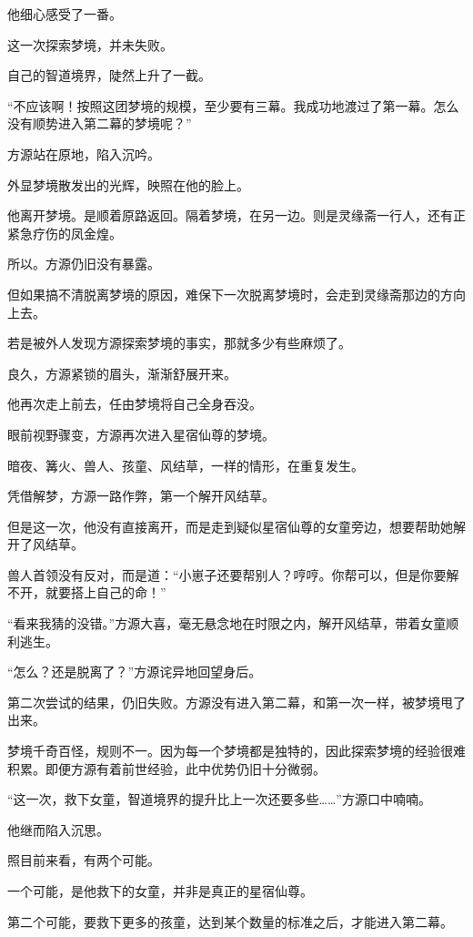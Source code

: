 \begin{this_body}
他细心感受了一番。

这一次探索梦境，并未失败。

自己的智道境界，陡然上升了一截。

“不应该啊！按照这团梦境的规模，至少要有三幕。我成功地渡过了第一幕。怎么没有顺势进入第二幕的梦境呢？”

方源站在原地，陷入沉吟。

外显梦境散发出的光辉，映照在他的脸上。

他离开梦境。是顺着原路返回。隔着梦境，在另一边。则是灵缘斋一行人，还有正紧急疗伤的凤金煌。

所以。方源仍旧没有暴露。

但如果搞不清脱离梦境的原因，难保下一次脱离梦境时，会走到灵缘斋那边的方向上去。

若是被外人发现方源探索梦境的事实，那就多少有些麻烦了。

良久，方源紧锁的眉头，渐渐舒展开来。

他再次走上前去，任由梦境将自己全身吞没。

眼前视野骤变，方源再次进入星宿仙尊的梦境。

暗夜、篝火、兽人、孩童、风结草，一样的情形，在重复发生。

凭借解梦，方源一路作弊，第一个解开风结草。

但是这一次，他没有直接离开，而是走到疑似星宿仙尊的女童旁边，想要帮助她解开了风结草。

兽人首领没有反对，而是道：“小崽子还要帮别人？哼哼。你帮可以，但是你要解不开，就要搭上自己的命！”

“看来我猜的没错。”方源大喜，毫无悬念地在时限之内，解开风结草，带着女童顺利逃生。

“怎么？还是脱离了？”方源诧异地回望身后。

第二次尝试的结果，仍旧失败。方源没有进入第二幕，和第一次一样，被梦境甩了出来。

梦境千奇百怪，规则不一。因为每一个梦境都是独特的，因此探索梦境的经验很难积累。即便方源有着前世经验，此中优势仍旧十分微弱。

“这一次，救下女童，智道境界的提升比上一次还要多些……”方源口中喃喃。

他继而陷入沉思。

照目前来看，有两个可能。

一个可能，是他救下的女童，并非是真正的星宿仙尊。

第二个可能，要救下更多的孩童，达到某个数量的标准之后，才能进入第二幕。


\end{this_body}
